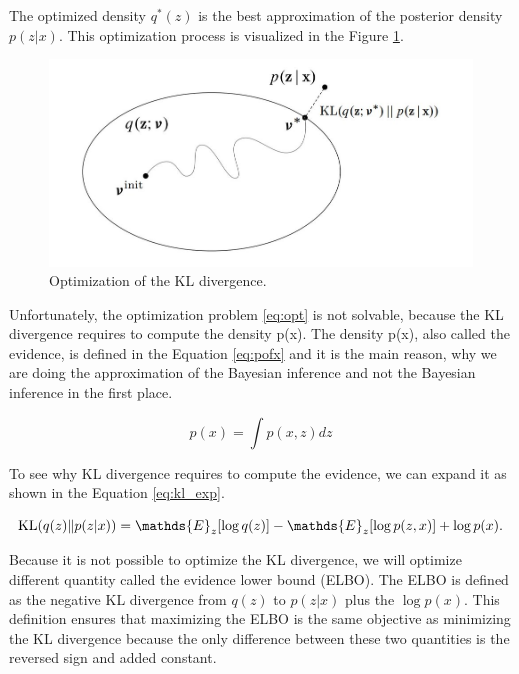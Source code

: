 The optimized density $q^{\ast}(z)$ is the best approximation of the posterior density $p(z|x)$.
This optimization process is visualized in the Figure \ref{fig:opt}.

\begin{figure}[H]
    \centering
    \includegraphics[width=\linewidth]{images/VI.png}
    \caption{Optimization of the KL divergence.}
    \label{fig:opt}
\end{figure}

Unfortunately, the optimization problem \ref{eq:opt} is not solvable, because the KL divergence requires to compute the density p(x).
The density p(x), also called the evidence, is defined in the Equation \ref{eq:pofx} and it is the main reason, why we are doing the approximation of the Bayesian inference and not the Bayesian inference in the first place.

\begin{equation}
    p(x) = \int p(x, z) dz
    \label{eq:pofx}
\end{equation}

To see why KL divergence requires to compute the evidence, we can expand it as shown in the Equation \ref{eq:kl_exp}.

\begin{equation}
    \KL(q(z) \| p(z|x)) = \mathds{E}_{z}[\log q(z)] - \mathds{E}_{z}[\log p(z,x)] + \log p(x).
    \label{eq:kl_exp}
\end{equation}

Because it is not possible to optimize the KL divergence, we will optimize different quantity called the evidence lower bound (ELBO).
The ELBO is defined as the negative KL divergence from $q(z)$ to $p(z|x)$ plus the $\log p(x)$.
This definition ensures that maximizing the ELBO is the same objective as minimizing the KL divergence because the only difference between these two quantities is the reversed sign and added constant.

